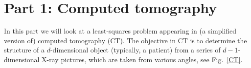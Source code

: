 \documentclass[10pt,a4paper]{article}
\theoremstyle{plain}
\theoremstyle{definition}
\begin{document}
\rhead{\today}

\fancyfoot[R] {\thepage}
\fancyfoot[C] {}

\listoftodos

\section*{Part 1: Computed tomography}
In this part we will look at a least-squares problem appearing in (a simplified version of) computed tomography (CT).
The objective in CT is to determine the structure of a \(d\)-dimensional object (typically, a patient) from a series of \(d-1\)-dimensional X-ray pictures, which are taken from various angles, see Fig.~\ref{CT}.
\end{document}
